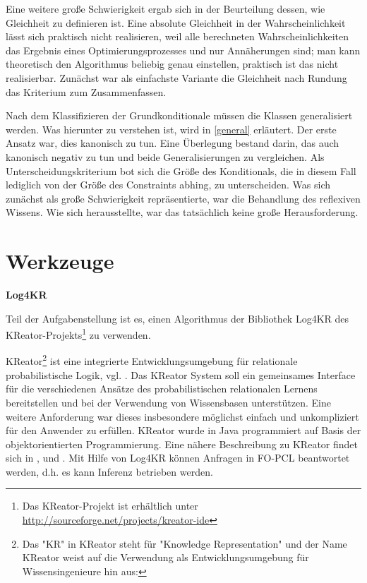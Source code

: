 \documentclass[a4paper, 11pt]{book}
\begin{document}
Eine weitere große Schwierigkeit ergab sich in der Beurteilung dessen, wie Gleichheit zu definieren ist. Eine absolute Gleichheit in der Wahrscheinlichkeit lässt sich praktisch nicht realisieren, weil alle berechneten Wahrscheinlichkeiten das Ergebnis eines Optimierungsprozesses und nur Annäherungen sind; man kann theoretisch den Algorithmus beliebig genau einstellen, praktisch ist das nicht realisierbar. Zunächst war als einfachste Variante die Gleichheit nach Rundung das Kriterium zum Zusammenfassen.

Nach dem Klassifizieren der Grundkonditionale müssen die Klassen generalisiert werden. Was hierunter zu verstehen ist, wird in \ref{general} erläutert. 
Der erste Ansatz war, dies kanonisch zu tun.
Eine Überlegung bestand darin, das auch kanonisch negativ zu tun und beide Generalisierungen zu vergleichen. Als Unterscheidungskriterium bot sich die Größe des Konditionals, die in diesem Fall lediglich von der Größe des Constraints abhing, zu unterscheiden.
Was sich zunächst als große Schwierigkeit repräsentierte, war die Behandlung des reflexiven Wissens. Wie sich herausstellte, war das tatsächlich keine große Herausforderung. 





\section{Werkzeuge}

\textbf{Log4KR}

Teil der Aufgabenstellung ist es, einen Algorithmus der Bibliothek Log4KR des \\ KReator-Projekts\footnote{Das KReator-Projekt ist erhältlich unter \href{http://sourceforge.net/projects/kreator-ide}{http://sourceforge.net/projects/kreator-ide}} zu verwenden.

KReator\footnote{Das "{}KR"{} in KReator steht für "{}Knowledge Representation"{} und der Name KReator weist auf die Verwendung als Entwicklungsumgebung für Wissensingenieure hin aus:\cite{FLT09}} ist eine integrierte Entwicklungsumgebung für relationale probabilistische Logik, vgl. \cite{BHM14}. Das KReator System soll ein gemeinsames Interface für die verschiedenen Ansätze des probabilistischen relationalen Lernens bereitstellen und bei der Verwendung von Wissensbasen unterstützen. Eine weitere Anforderung war dieses insbesondere möglichst einfach und unkompliziert für den Anwender zu erfüllen. KReator wurde in Java programmiert auf Basis der objektorientierten Programmierung. Eine nähere Beschreibung zu KReator findet sich in \cite{TFLKIB10}, \cite{KIBFT11} und \cite{FLT09}.
Mit Hilfe von Log4KR können Anfragen in FO-PCL beantwortet werden, d.h. es kann Inferenz betrieben werden.  
\end{document}
